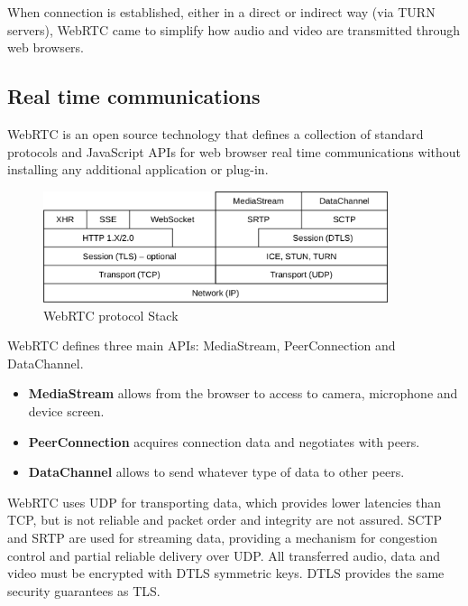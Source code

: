 When connection is established, either in a direct or indirect way (via \ac{TURN} servers), \ac{WebRTC} came to simplify how audio and video are transmitted through web browsers.

\subsection{Real time communications}

\ac{WebRTC} is an open source technology that defines a collection of standard protocols and JavaScript \ac{API}s for web browser real time communications without installing any additional application or plug-in.

\begin{figure}[H]
	\centering
	\includegraphics[width=0.9\textwidth]{figures/webrtc_stack.png}
	\caption{WebRTC protocol Stack}
\end{figure}

\ac{WebRTC} defines three main \ac{API}s: MediaStream, PeerConnection and DataChannel. 

\begin{itemize}
  \item \textbf{MediaStream} allows from the browser to access to camera, microphone and device screen. 

  \item \textbf{PeerConnection} acquires connection data and negotiates with peers.

  \item \textbf{DataChannel} allows to send whatever type of data to other peers.
\end{itemize}

\ac{WebRTC} uses \ac{UDP} for transporting data, which provides lower latencies than \ac{TCP}, but is not reliable and packet order and integrity are not assured. \ac{SCTP} and \ac{SRTP} are used for streaming data, providing a mechanism for congestion control and partial reliable delivery over \ac{UDP}. All transferred audio, data and video must be encrypted with \ac{DTLS} symmetric keys. \ac{DTLS} provides the same security guarantees as \ac{TLS}. 

